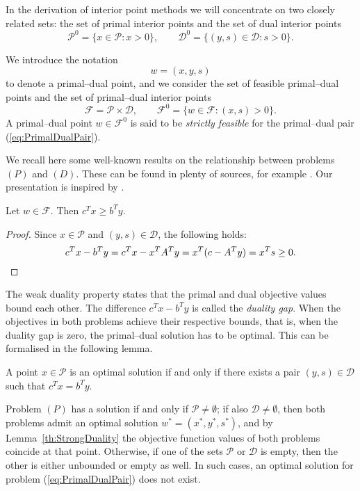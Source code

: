 In the derivation of interior point methods we will concentrate on
two closely related sets: the set of primal interior points and
the set of dual interior points 
\[
\mathcal{P}^0 = \{ x \in \mathcal{P} : x > 0 \}, \qquad
\mathcal{D}^0 = \{ (y,s) \in \mathcal{D} : s > 0 \}.
\]

We introduce the notation
\[
  w = (x,y,s)
\]
to denote a primal--dual point, and
we consider the set of feasible primal--dual points 
and the set of primal--dual interior points
\[
  \mathcal{F} = \mathcal{P} \times \mathcal{D}, \qquad
  \mathcal{F}^0 = \{ w \in \mathcal{F} : (x,s) > 0 \}.
\]
A primal--dual point $w\in\mathcal{F}^0$ is said to be {\em strictly feasible}
for the primal--dual pair (\ref{eq:PrimalDualPair}).

We recall here some well-known results on the relationship between
problems $(P)$ and $(D)$.
These can be found in plenty of sources, for example 
\cite{lp:Chvatal,Schrijver86}.
Our presentation is inspired by 
\cite{GulerRoosTerlakyVial,Megiddo,ipm:Wright97}.

\begin{lemma}
Let $w \in \mathcal{F}$. Then $c^Tx \ge b^Ty$.
\end{lemma}
%
\begin{proof}
Since $x \in \mathcal{P}$ and $(y,s) \in \mathcal{D}$, 
the following holds:
\[
  c^Tx - b^Ty = c^Tx - x^TA^Ty = x^T(c - A^T y) = x^Ts \ge 0. \qedhere
\]
\end{proof}

The weak duality property states that the primal and dual objective
values bound each other.
The difference $c^Tx - b^Ty$ is called the {\em duality gap}.
When the objectives in both problems achieve their respective bounds,
that is, when the duality gap is zero, the primal--dual solution has
to be optimal. This can be formalised
in the following lemma.

\begin{lemma}  \label{th:StrongDuality}
A point $x \in \mathcal{P}$ is an optimal solution if and only if
there exists a pair $(y,s) \in \mathcal{D}$ such that $c^Tx = b^Ty$.
\end{lemma}

Problem $(P)$ has a solution if and only if $\mathcal{P} \ne \emptyset$;
if also $\mathcal{D} \ne \emptyset$, then both problems admit an
optimal solution $w^* = (x^*, y^*, s^*)$, and by Lemma~\ref{th:StrongDuality}
the objective function 
values of both problems coincide at that point. 
Otherwise, if one of the sets $\mathcal{P}$ or $\mathcal{D}$ is empty, 
then the other is either unbounded or empty as well. 
In such cases, an optimal
solution for problem (\ref{eq:PrimalDualPair}) does not exist.

